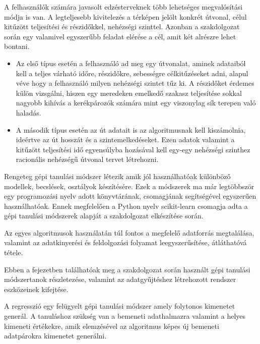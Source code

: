A felhasználók számára javasolt edzésterveknek több lehetséges megvalósítási módja is van. A legteljesebb kivitelezés a térképen jelölt konkrét útvonal, célul kitűzött teljesítési és részidőkkel, nehézségi szinttel. Azonban a szakdolgozat során egy valamivel egyszerűbb feladat elérése a cél, amit két alrészre lehet bontani.
\begin{itemize}
	\item Az első típus esetén a felhasználó ad meg egy útvonalat, aminek adataiból kell a teljes várható időre, részidőkre, sebességre célkitűzéseket adni, alapul véve hogy a felhasználó milyen nehézségi szintet tűz ki. A részidőket érdemes külön vizsgálni, hiszen egy meredeken emelkedő szakasz teljesítése sokkal nagyobb kihívás a kerékpározók számára mint egy viszonylag sík terepen való haladás.
	\item A második típus esetén az út adatait is az algoritmusnak kell kiszámolnia, ideértve az út hosszát és a szintemelkedéseket. Ezen adatok valamint a kitűzött teljesítési idő egyensúlyba hozásával kell egy-egy nehézségi szinthez racionális nehézségű útvonal tervet létrehozni.
\end{itemize}


Rengeteg gépi tanulási módszer létezik amik jól használhatóak különböző modellek, becslések, osztályok készítésére. Ezek a módszerek ma már legtöbbször egy programozási nyelv adott könyvtárának, csomagjának segítségével egyszerűen használhatóak. Ennek megfelelően a Python nyelv scikit-learn \cite{scikitlearn} csomagja adta a gépi tanulási módszerek alapját a szakdolgozat elkészítése során.

Az egyes algoritmusok használatán túl fontos a megfelelő adatforrás megtalálása, valamint az adatkinyerési és feldolgozási folyamat leegyszerűsítése, átláthatóvá tétele. 

Ebben a fejezetben találhatóak meg a szakdolgozat során használt gépi tanulási módszertanok részletezése, valamint az adatgyűjtéshez létrehozott rendszer eszközeinek kifejtése.



 \label{subsec:regression}
A regresszió egy felügyelt gépi tanulási módszer amely folytonos kimenetet generál. A tanuláshoz szükség van a bemeneti adathalmazra valamint a helyes kimeneti értékekre, amik elemzésével az algoritmus képes új bemeneti adatpárokra kimenetet generálni.

